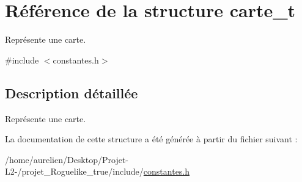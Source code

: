\hypertarget{structcarte__t}{}\section{Référence de la structure carte\+\_\+t}
\label{structcarte__t}


Représente une carte.  




{\ttfamily \#include $<$constantes.\+h$>$}



\subsection{Description détaillée}
Représente une carte. 

La documentation de cette structure a été générée à partir du fichier suivant \+:\begin{DoxyCompactItemize}
\item 
/home/aurelien/\+Desktop/\+Projet-\/\+L2-\//projet\+\_\+\+Roguelike\+\_\+true/include/\hyperlink{constantes_8h}{constantes.\+h}\end{DoxyCompactItemize}

